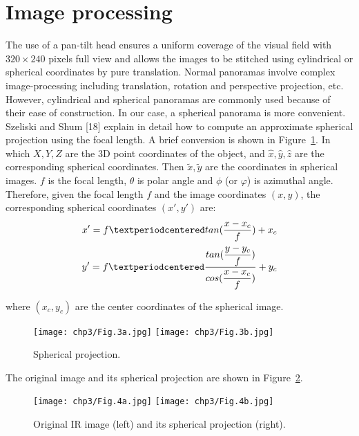 \section{Image processing}
The use of a pan-tilt head ensures a uniform coverage of the visual field with $ 320×240 $ pixels full view and allows the images to be stitched using cylindrical or spherical coordinates by pure translation. Normal panoramas involve complex image-processing including translation, rotation and perspective projection, etc. However, cylindrical and spherical panoramas are commonly used because of their ease of construction. In our case, a spherical panorama is more convenient. Szeliski and Shum [18] explain in detail how to compute an approximate spherical projection using the focal length. A brief conversion is shown in Figure~\ref{Sph_pro}. In which $X, Y, Z$ are the 3D point coordinates of the object, and $\hat{x}, \hat{y}, \hat{z}$ are the corresponding spherical coordinates. Then $\tilde{x}, \tilde{y}$ are the coordinates in spherical images. $f$ is the focal length, $\theta$ is polar angle and $\phi$ (or $\varphi$) is azimuthal angle. Therefore, given the focal length $ f $ and the image coordinates $ (x, y) $, the corresponding spherical coordinates $ (x', y') $ are:
\begin{align}
x'={} f·tan(\dfrac{x-x_c}{f})+x_c \notag \\
y'=f·\frac{tan(\dfrac{y-y_c}{f})}{cos(\dfrac{x-x_c}{f})} +y_c
\end{align}

where $ (x_c,y_c) $ are the center coordinates of the spherical image.
\begin{figure}[ht]
    \centering
    \texttt{[image: chp3/Fig.3a.jpg]}
    \texttt{[image: chp3/Fig.3b.jpg]}
    \caption{Spherical projection.}
    \label{Sph_pro}
\end{figure}

The original image and its spherical projection are shown in Figure~\ref{Orig_sph}.
\begin{figure}[ht]
    \centering
    \texttt{[image: chp3/Fig.4a.jpg]}
    \texttt{[image: chp3/Fig.4b.jpg]}
    \caption{Original IR image (left) and its spherical projection (right).}
    \label{Orig_sph}
\end{figure}

